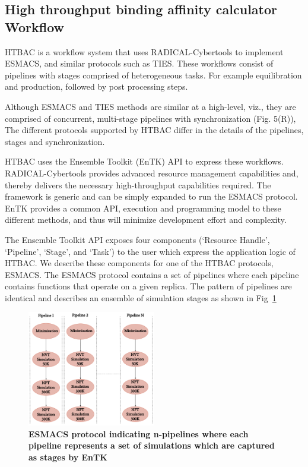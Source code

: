 \subsection{High throughput binding affinity calculator Workflow}



HTBAC is a workflow system that uses RADICAL-Cybertools to implement ESMACS,
and similar protocols such as TIES. These workflows consist of pipelines with
stages comprised of heterogeneous tasks. For example equilibration and
production, followed by post processing steps. 

Although ESMACS and TIES methods are similar at a high-level, viz., they are
comprised of concurrent, multi-stage pipelines with synchronization (Fig.
5(R)), The different protocols supported by HTBAC differ in the details of the
pipelines, stages and synchronization.

HTBAC uses the Ensemble Toolkit (EnTK) API to express these workflows. RADICAL-Cybertools
provides advanced resource management capabilities and, thereby delivers the
necessary high-throughput capabilities required. The framework is generic and
can be simply expanded to run the ESMACS protocol. EnTK provides a common API,
execution and programming model to these different methods, and thus will
minimize development effort and complexity.

The Ensemble Toolkit API exposes four components (‘Resource
Handle’, ‘Pipeline’, ‘Stage’, and ‘Task') to the user which express the
application logic of HTBAC. We describe these components for one of the HTBAC
protocols, ESMACS. The ESMACS protocol contains a set of pipelines where each
pipeline contains functions that operate on a given replica. The pattern of
pipelines are identical and describes an ensemble of simulation stages as shown in Fig~\ref{figure:ESMACS-pipelines}

\begin{figure}[ht]
\centering
  \includegraphics[width=0.5\textwidth]{FIGURES/HT-BAC-NAMD-pipelines-control-flow-only.pdf}
  \caption{\bf ESMACS protocol indicating n-pipelines where each pipeline represents a set of simulations which are captured as stages by EnTK}
   \label{figure:ESMACS-pipelines}
\end{figure}

